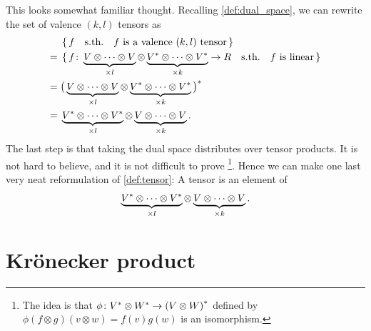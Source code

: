 \documentclass[english, 12pt]{article}
\begin{document}
This looks somewhat familiar thought.
Recalling \cref{def:dual_space}, we can rewrite the set of valence $(k, l)$ tensors as
\begin{align*}
	&\set{f \quad \textrm{s.th.} \quad f \textrm{ is a valence $(k, l)$ tensor}}\\
	={}& \set{f \colon\underbrace{V \otimes \dots \otimes V}_{\times l} \otimes \underbrace{{V}^{*} \otimes \dots \otimes {V}^{*}}_{\times k} \to R \quad \textrm{s.th.} \quad f \text{ is linear}}\\
	={}& {\big( \underbrace{V \otimes \dots \otimes V}_{\times l} \otimes \underbrace{{V}^{*} \otimes \dots \otimes {V}^{*}}_{\times k} \big)}^{*}\\
	={}& \underbrace{{V}^{*} \otimes \dots \otimes {V}^{*}}_{\times l} \otimes \underbrace{V \otimes \dots \otimes V}_{\times k}.
\end{align*}
The last step is that taking the dual space distributes over tensor products.
It is not hard to believe, and it is not difficult to prove%
\footnote{%
	The idea is that $\phi \colon {V}^{*} \otimes {W}^{*} \to {(V \otimes W)}^{*}$ defined by $\phi(f \otimes g)(v \otimes w) = f(v) g(w)$ is an isomorphism.
}.
Hence we can make one last very neat reformulation of \cref{def:tensor}: A tensor is an element of
\begin{align*}
	\underbrace{{V}^{*} \otimes \dots \otimes {V}^{*}}_{\times l} \otimes \underbrace{V \otimes \dots \otimes V}_{\times k}.
\end{align*}


\section{Krönecker product}%
\label{sec:krönecker_product}
\end{document}
